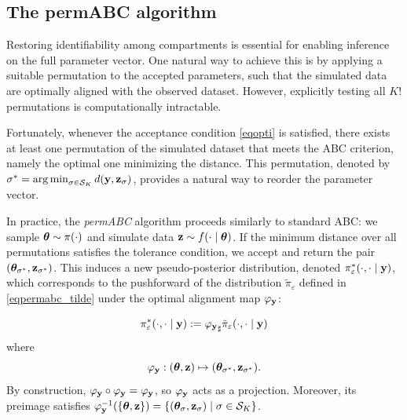 \subsection{The permABC algorithm}
\label{secpermabc_star}


Restoring identifiability among compartments is essential for enabling inference on the full parameter vector. One natural way to achieve this is by applying a suitable permutation to the accepted parameters, such that the simulated data are optimally aligned with the observed dataset. However, explicitly testing all \( K! \) permutations is computationally intractable.

Fortunately, whenever the acceptance condition \eqref{eqopti} is satisfied, there exists at least one permutation of the simulated dataset that meets the ABC criterion, namely the optimal one minimizing the distance. This permutation, denoted by \( \sigma^* = \operatorname*{arg\,min}_{\sigma \in \mathcal{S}_K} d(\mathbf{y}, \mathbf{z}_{\sigma}) \), provides a natural way to reorder the parameter vector.

In practice, the \emph{permABC} algorithm proceeds similarly to standard ABC: we sample \( \boldsymbol{\theta} \sim \pi(\cdot) \) and simulate data \( \mathbf{z} \sim f(\cdot \mid \boldsymbol{\theta}) \). If the minimum distance over all permutations satisfies the tolerance condition, we accept and return the pair \( (\boldsymbol{\theta}_{\sigma^*}, \mathbf{z}_{\sigma^*}) \). This induces a new pseudo-posterior distribution, denoted \( \pi_{\varepsilon}^*(\cdot, \cdot \mid \mathbf{y}) \), which corresponds to the pushforward of the distribution \( \tilde{\pi}_\varepsilon \) defined in \eqref{eqpermabc_tilde} under the optimal alignment map \( \varphi_{\mathbf{y}} \):

\begin{equation}
\label{eqproj}
\pi^{*}_{\varepsilon}(\cdot, \cdot \mid \mathbf{y})
:= {\varphi_{\mathbf{y}}}_{\sharp} \tilde{\pi}_{\varepsilon}(\cdot, \cdot \mid \mathbf{y})
\end{equation}
where
\[
\varphi_{\mathbf{y}}: (\boldsymbol{\theta}, \mathbf{z}) \mapsto (\boldsymbol{\theta}_{\sigma^*}, \mathbf{z}_{\sigma^*}).
\]
By construction, \( \varphi_{\mathbf{y}} \circ \varphi_{\mathbf{y}} = \varphi_{\mathbf{y}} \), so \( \varphi_{\mathbf{y}} \) acts as a projection. Moreover, its preimage satisfies \( \varphi_{\mathbf{y}}^{-1}(\{\boldsymbol{\theta}, \mathbf{z}\}) = \{(\boldsymbol{\theta}_{\sigma}, \mathbf{z}_{\sigma}) \mid \sigma \in \mathcal{S}_K\} \).

